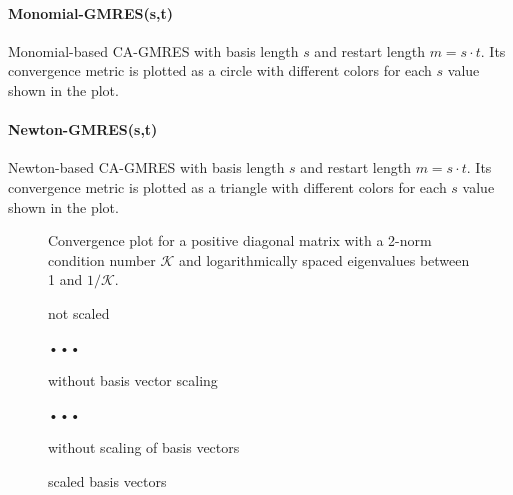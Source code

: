 \documentclass{scrartcl}
\numberwithin{equation}{section}
\begin{document}
\paragraph{Monomial-GMRES(s,t)} Monomial-based CA-GMRES with basis length $s$ and restart length $m = s \cdot t$. Its convergence metric is plotted as a circle with different colors for each $s$ value shown in the plot.

\paragraph{Newton-GMRES(s,t)} Newton-based CA-GMRES with basis length $s$ and restart length $m = s \cdot t$. Its convergence metric is plotted as a triangle with different colors for each $s$ value shown in the plot.

\begin{figure}[H]
	\centering
	\resizebox{.9\textwidth}{!}{}	
	\caption{Convergence plot for a positive diagonal matrix with a 2-norm condition number $\mathcal{K}$ and logarithmically spaced eigenvalues between 1 and $1/\mathcal{K}$.}
	\label{fig:dmat3}
\end{figure}

\begin{figure}
	\centering
	\resizebox{.9\textwidth}{!}{}
	\caption{not scaled}
	\label{fig:watt1_noscale}
\end{figure}
\begin{figure}
	\centering
	\resizebox{.9\textwidth}{!}{}
	\caption{•••}
	\label{fig:watt1_scale}
\end{figure}
\begin{figure}
	\centering
	\resizebox{.9\textwidth}{!}{}
	\caption{without basis vector scaling}
	\label{fig:watt1_ilu0}
\end{figure}
\begin{figure}
	\centering
	\resizebox{.9\textwidth}{!}{}
	\caption{•••}
	\label{fig:bmw7st1}
\end{figure}

\begin{figure}
	\centering
	\resizebox{.9\textwidth}{!}{}
	\caption{without scaling of basis vectors}
	\label{fig:xenon2_noscale}
\end{figure}
\begin{figure}
	\centering
	\resizebox{.9\textwidth}{!}{}
	\caption{scaled basis vectors}
	\label{fig:xenon2_scale}
\end{figure}
\end{document}
